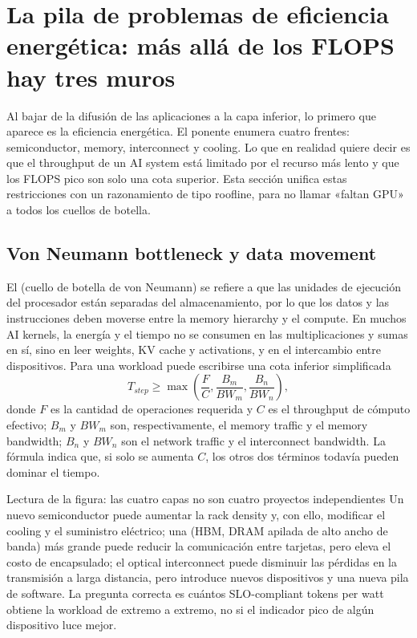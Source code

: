 \section{La pila de problemas de eficiencia energética: más allá de los FLOPS hay tres muros}

Al bajar de la difusión de las aplicaciones a la capa inferior, lo primero que aparece es la eficiencia energética. El ponente enumera cuatro frentes: semiconductor, memory, interconnect y cooling. Lo que en realidad quiere decir es que el throughput de un AI system está limitado por el recurso más lento y que los FLOPS pico son solo una cota superior. Esta sección unifica estas restricciones con un razonamiento de tipo roofline, para no llamar «faltan GPU» a todos los cuellos de botella.

\subsection{Von Neumann bottleneck y data movement}

El  (cuello de botella de von Neumann) se refiere a que las unidades de ejecución del procesador están separadas del almacenamiento, por lo que los datos y las instrucciones deben moverse entre la memory hierarchy y el compute. En muchos AI kernels, la energía y el tiempo no se consumen en las multiplicaciones y sumas en sí, sino en leer weights, KV cache y activations, y en el intercambio entre dispositivos. Para una workload puede escribirse una cota inferior simplificada
\[
T_{step}\geq \max\left(\frac{F}{C},\frac{B_m}{BW_m},\frac{B_n}{BW_n}\right),
\]
donde $F$ es la cantidad de operaciones requerida y $C$ es el throughput de cómputo efectivo; $B_m$ y $BW_m$ son, respectivamente, el memory traffic y el memory bandwidth; $B_n$ y $BW_n$ son el network traffic y el interconnect bandwidth. La fórmula indica que, si solo se aumenta $C$, los otros dos términos todavía pueden dominar el tiempo.


\begin{knowledgebox}{Lectura de la figura: las cuatro capas no son cuatro proyectos independientes}
Un nuevo semiconductor puede aumentar la rack density y, con ello, modificar el cooling y el suministro eléctrico; una  (HBM, DRAM apilada de alto ancho de banda) más grande puede reducir la comunicación entre tarjetas, pero eleva el costo de encapsulado; el optical interconnect puede disminuir las pérdidas en la transmisión a larga distancia, pero introduce nuevos dispositivos y una nueva pila de software. La pregunta correcta es cuántos SLO-compliant tokens per watt obtiene la workload de extremo a extremo, no si el indicador pico de algún dispositivo luce mejor.
\end{knowledgebox}

